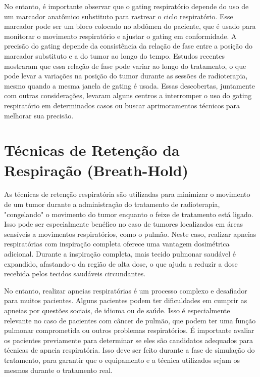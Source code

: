 \documentclass[11pt,a4paper]{article}
\begin{document}
	No entanto, é importante observar que o gating respiratório depende do uso de um marcador anatômico substituto para rastrear o ciclo respiratório. Esse marcador pode ser um bloco colocado no abdômen do paciente, que é usado para monitorar o movimento respiratório e ajustar o gating em conformidade. A precisão do gating depende da consistência da relação de fase entre a posição do marcador substituto e a do tumor ao longo do tempo. Estudos recentes mostraram que essa relação de fase pode variar ao longo do tratamento, o que pode levar a variações na posição do tumor durante as sessões de radioterapia, mesmo quando a mesma janela de gating é usada. Essas descobertas, juntamente com outras considerações, levaram alguns centros a interromper o uso do gating respiratório em determinados casos ou buscar aprimoramentos técnicos para melhorar sua precisão.

\section{Técnicas de Retenção da Respiração (Breath-Hold)}

	As técnicas de retenção respiratória são utilizadas para minimizar o movimento de um tumor durante a administração do tratamento de radioterapia, "congelando" o movimento do tumor enquanto o feixe de tratamento está ligado. Isso pode ser especialmente benéfico no caso de tumores localizados em áreas sensíveis a movimentos respiratórios, como o pulmão. Neste caso, realizar apneias respiratórias com inspiração completa oferece uma vantagem dosimétrica adicional. Durante a inspiração completa, mais tecido pulmonar saudável é expandido, afastando-o da região de alta dose, o que ajuda a reduzir a dose recebida pelos tecidos saudáveis circundantes.

	No entanto, realizar apneias respiratórias é um processo complexo e desafiador para muitos pacientes. Alguns pacientes podem ter dificuldades em cumprir as apneias por questões sociais, de idioma ou de saúde. Isso é especialmente relevante no caso de pacientes com câncer de pulmão, que podem ter uma função pulmonar comprometida ou outros problemas respiratórios. É importante avaliar os pacientes previamente para determinar se eles são candidatos adequados para técnicas de apneia respiratória. Isso deve ser feito durante a fase de simulação do tratamento, para garantir que o equipamento e a técnica utilizados sejam os mesmos durante o tratamento real.
\end{document}
